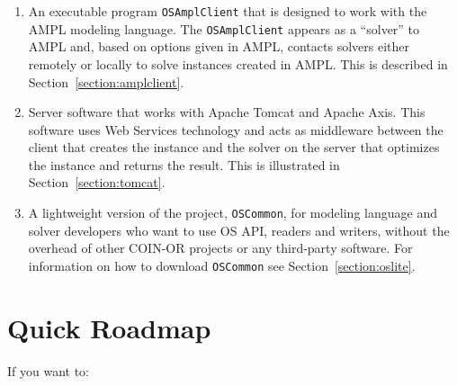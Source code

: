 \documentclass[11pt]{article}
\renewcommand{\_}{{\char"5F}}
\renewcommand{\{}{{\char"7B}}
\renewcommand{\}}{{\char"7D}}
\renewcommand{\^}{{\char"0D}}
\renewcommand{\'}{{\char"0D}}
\begin{document}
\begin{enumerate}
\item{}  An executable program {\tt OSAmplClient} that is designed to work with 
the AMPL modeling language. The {\tt OSAmplClient} appears as a ``solver'' to AMPL and, based on options 
given in AMPL, contacts solvers either remotely or locally to solve instances created in AMPL. This is described in
Section~\ref{section:amplclient}.

\item{}  Server software that works with Apache Tomcat and Apache Axis.
This software uses Web Services technology and acts as middleware between the client that creates the instance
and the  solver on the server that optimizes the instance and returns the result. This is illustrated in
Section~\ref{section:tomcat}.

\item{}  A lightweight version of the project, {\tt OSCommon}, for modeling language and 
solver developers who want to use OS API, readers and writers, without the overhead of other COIN-OR projects or any 
third-party software. For information on how to download {\tt OSCommon} see Section~\ref{section:oslite}.
\end{enumerate}


\section{Quick Roadmap}\label{section:roadmap}

If you want to:
\end{document}
